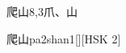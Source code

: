\begin{entry}{爬山}{8,3}{⽖、⼭}
  \begin{phonetics}{爬山}{pa2shan1}[][HSK 2]
  \end{phonetics}
\end{entry}
